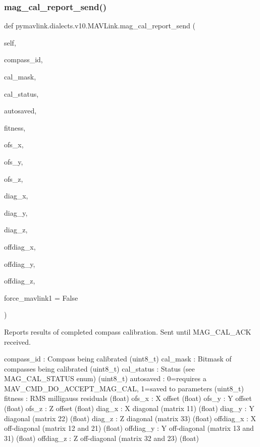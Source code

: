 \begin{DoxyVerb}
\begin{DoxyVerb}
\begin{DoxyVerb}
\begin{DoxyVerb}
\subsubsection{\texorpdfstring{mag\+\_\+cal\+\_\+report\+\_\+send()}{mag\_cal\_report\_send()}}
{\footnotesize\ttfamily def pymavlink.\+dialects.\+v10.\+M\+A\+V\+Link.\+mag\+\_\+cal\+\_\+report\+\_\+send (\begin{DoxyParamCaption}\item[{}]{self,  }\item[{}]{compass\+\_\+id,  }\item[{}]{cal\+\_\+mask,  }\item[{}]{cal\+\_\+status,  }\item[{}]{autosaved,  }\item[{}]{fitness,  }\item[{}]{ofs\+\_\+x,  }\item[{}]{ofs\+\_\+y,  }\item[{}]{ofs\+\_\+z,  }\item[{}]{diag\+\_\+x,  }\item[{}]{diag\+\_\+y,  }\item[{}]{diag\+\_\+z,  }\item[{}]{offdiag\+\_\+x,  }\item[{}]{offdiag\+\_\+y,  }\item[{}]{offdiag\+\_\+z,  }\item[{}]{force\+\_\+mavlink1 = {\ttfamily False} }\end{DoxyParamCaption})}

\begin{DoxyVerb}Reports results of completed compass calibration. Sent until
MAG_CAL_ACK received.

compass_id                : Compass being calibrated (uint8_t)
cal_mask                  : Bitmask of compasses being calibrated (uint8_t)
cal_status                : Status (see MAG_CAL_STATUS enum) (uint8_t)
autosaved                 : 0=requires a MAV_CMD_DO_ACCEPT_MAG_CAL, 1=saved to parameters (uint8_t)
fitness                   : RMS milligauss residuals (float)
ofs_x                     : X offset (float)
ofs_y                     : Y offset (float)
ofs_z                     : Z offset (float)
diag_x                    : X diagonal (matrix 11) (float)
diag_y                    : Y diagonal (matrix 22) (float)
diag_z                    : Z diagonal (matrix 33) (float)
offdiag_x                 : X off-diagonal (matrix 12 and 21) (float)
offdiag_y                 : Y off-diagonal (matrix 13 and 31) (float)
offdiag_z                 : Z off-diagonal (matrix 32 and 23) (float)\end{DoxyVerb}
 \mbox{\label{classpymavlink_1_1dialects_1_1v10_1_1MAVLink_a391fcb42217715957b2f08902102e9f3}} 

\end{DoxyVerb}
\end{DoxyVerb}
\end{DoxyVerb}
\end{DoxyVerb}
